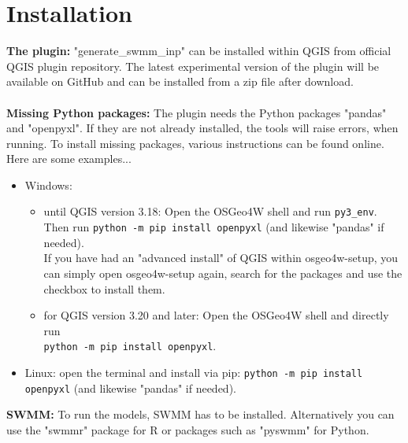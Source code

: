 \documentclass[10pt,a4paper,oneside]{scrbook}
\newcommand{\lil}[1]{\lstinline{#1}}
\begin{document}
\section{Installation} \label{Installation}
\textbf{The plugin:} "generate\_swmm\_inp" can be installed within QGIS from official QGIS plugin repository. The latest experimental version of the plugin will be available on GitHub \cite{schilling2021} and can be installed from a zip file after download. \\
\\
\textbf{Missing Python packages:} The plugin needs the Python packages "pandas" and "openpyxl". If they are not already installed, the tools will raise errors, when running. To install missing packages, various instructions can be found online. Here are some examples...
\begin{itemize}
	\item Windows:
	\begin{itemize}
		\item until QGIS version 3.18: Open the OSGeo4W shell and run \colorbox{mygray}{\lil{py3_env}}. 
		\\Then run \colorbox{mygray}{\lil{python -m pip install openpyxl}} (and likewise "pandas" if needed).
		\\If you have had an "advanced install" of QGIS within osgeo4w-setup, you can simply open osgeo4w-setup again, search for the packages and use the checkbox to install them.
		\item for QGIS version 3.20 and later: 
		Open the OSGeo4W shell and directly run\\
		\colorbox{mygray}{\lil{python -m pip install openpyxl}}.
	\end{itemize}
	\item Linux: open the terminal and install via pip: 
	\colorbox{mygray}{\lil{python -m pip install openpyxl}} (and likewise "pandas" if needed).
\end{itemize} 
\textbf{SWMM:} To run the models, SWMM has to be installed. Alternatively you can use the "swmmr" package \cite{leutnant2019} for R or packages such as "pyswmm" \cite{mcdonell2020} for Python. \\
\end{document}
